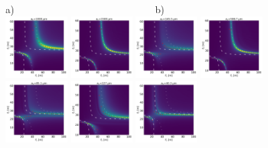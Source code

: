 \documentclass[9pt,twocolumn,twoside]{osajnl}
\begin{document}
\begin{figure}[htbp]
    \centering
    a)~~~~~~~~~~~~~~~~~~~~~~~~~~~~~b) \\
    \includegraphics[width=0.21\textwidth]{figures/H_3.png}
    \includegraphics[width=0.21\textwidth]{figures/V_3.png}
    \includegraphics[width=0.21\textwidth]{figures/H_2.png}
    \includegraphics[width=0.21\textwidth]{figures/V_2.png}    
    \includegraphics[width=0.21\textwidth]{figures/H_1.png}
    \includegraphics[width=0.21\textwidth]{figures/V_1.png}
    \includegraphics[width=0.21\textwidth]{figures/H_0.png}

\end{figure}
\end{document}
